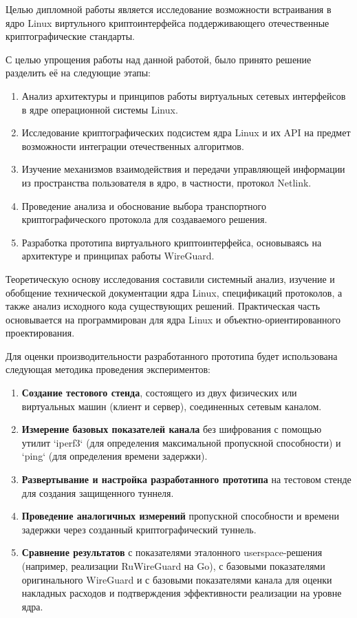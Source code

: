 Целью дипломной работы является исследование возможности встраивания в ядро Linux виртульного криптоинтерфейса поддерживающего отечественные криптографические стандарты.

С целью упрощения работы над данной работой, было принято решение разделить её на следующие этапы:
\begin{enumerate}
    \item Анализ архитектуры и принципов работы виртуальных сетевых интерфейсов в ядре операционной системы Linux.
    \item Исследование криптографических подсистем ядра Linux и их API на предмет возможности интеграции отечественных алгоритмов.
    \item Изучение механизмов взаимодействия и передачи управляющей информации из пространства пользователя в ядро, в частности, протокол Netlink.
    \item Проведение анализа и обоснование выбора транспортного криптографического протокола для создаваемого решения.
    \item Разработка прототипа виртуального криптоинтерфейса, основываясь на архитектуре и принципах работы WireGuard.
\end{enumerate}

Теоретическую основу исследования составили системный анализ, изучение и обобщение технической документации ядра Linux, спецификаций протоколов, а также анализ исходного кода существующих решений.
Практическая часть основывается на программирован для ядра Linux и объектно-ориентированного проектирования.

Для оценки производительности разработанного прототипа будет использована следующая методика проведения экспериментов:
\begin{enumerate}
    \item \textbf{Создание тестового стенда}, состоящего из двух физических или виртуальных машин (клиент и сервер), соединенных сетевым каналом.
    \item \textbf{Измерение базовых показателей канала} без шифрования с помощью утилит `iperf3` (для определения максимальной пропускной способности) и `ping` (для определения времени задержки).
    \item \textbf{Развертывание и настройка разработанного прототипа} на тестовом стенде для создания защищенного туннеля.
    \item \textbf{Проведение аналогичных измерений} пропускной способности и времени задержки через созданный криптографический туннель.
    \item \textbf{Сравнение результатов} с показателями эталонного userspace-решения (например, реализации RuWireGuard на Go), с базовыми показателями оригинального WireGuard и с базовыми показателями канала для оценки накладных расходов и подтверждения эффективности реализации на уровне ядра.
\end{enumerate}

